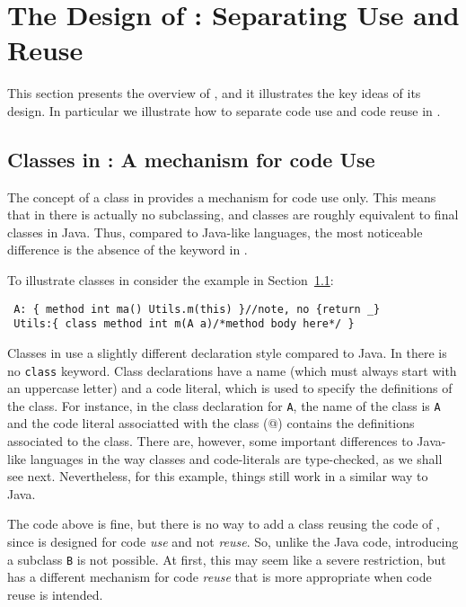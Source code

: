 \section{The Design of \name: Separating Use and Reuse}

This section presents the overview of \name, and it illustrates the
key ideas of its design. In particular we illustrate how to separate code use and 
code reuse in \name. %


\subsection{Classes in \name: A mechanism for code Use}
The concept of a class in \name provides a mechanism for code use
only. This means that in \name there is actually no subclassing, and
classes are roughly equivalent to final classes in Java.  Thus,
compared to Java-like languages, the most noticeable difference is the
absence of the \Q@extends@ keyword in \name. 

To illustrate classes in \name consider the example in Section~\ref{}:

\begin{lstlisting}
 A: { method int ma() Utils.m(this) }//note, no {return _}
 Utils:{ class method int m(A a)/*method body here*/ }
\end{lstlisting} 

\noindent Classes in \name use a slightly different declaration style compared
to Java. In \name there is no \lstinline{class} keyword. 
Class declarations have a name (which must always start with
an uppercase letter) and a code literal, which is used to specify the
definitions of the class. For instance, in the class declaration
for \lstinline{A}, the name of the class is \lstinline{A} and the code 
literal associatted with the class (@) contains the definitions associated to the
class. There are, however, some 
important differences to Java-like languages in the way 
classes and code-literals are type-checked, as we shall see next. 
Nevertheless, for this example, things still work in a similar way to Java. 

The \name code above is fine, but there is no way to add a class 
\Q@B@ reusing the code of \Q@A@, since
\Q@A@ is designed for code \emph{use} and not \emph{reuse}. So, unlike
the Java code, introducing a subclass
\lstinline{B} is not possible. At first, this may seem like a severe restriction, but
\name has a different mechanism for code \emph{reuse} that 
is more appropriate when code reuse is intended. 

